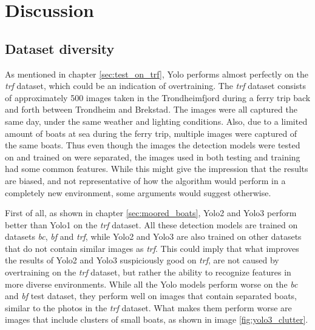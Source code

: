 \chapter{Discussion}

\section{Dataset diversity}
\label{dataset_divers}
As mentioned in chapter \ref{sec:test_on_trf}, Yolo performs almost perfectly on the \textit{trf} dataset, which could be an indication of overtraining. The \textit{trf} dataset consists of approximately 500 images taken in the Trondheimfjord during a ferry trip back and forth between Trondheim and Brekstad. The images were all captured the same day, under the same weather and lighting conditions. Also, due to a limited amount of boats at sea during the ferry trip, multiple images were captured of the same boats. Thus even though the images the detection models were tested on and trained on were separated, the images used in both testing and training had some common features. While this might give the impression that the results are biased, and not representative of how the algorithm would perform in a completely new environment, some arguments would suggest otherwise.

\vspace{3mm}

First of all, as shown in chapter \ref{sec:moored_boats}, Yolo2 and Yolo3 perform better than Yolo1 on the \textit{trf} dataset. All these detection models are trained on datasets \textit{bc}, \textit{bf} and \textit{trf}, while Yolo2 and Yolo3 are also trained on other datasets that do not contain similar images as \textit{trf}. This could imply that what improves the results of Yolo2 and Yolo3 suspiciously good on \textit{trf}, are not caused by overtraining on the \textit{trf} dataset, but rather the ability to recognize features in more diverse environments. While all the Yolo models perform worse on the \textit{bc} and \textit{bf} test dataset, they perform well on images that contain separated boats, similar to the photos in the \textit{trf} dataset. What makes them perform worse are images that include clusters of small boats, as shown in image \ref{fig:yolo3_clutter}. 

